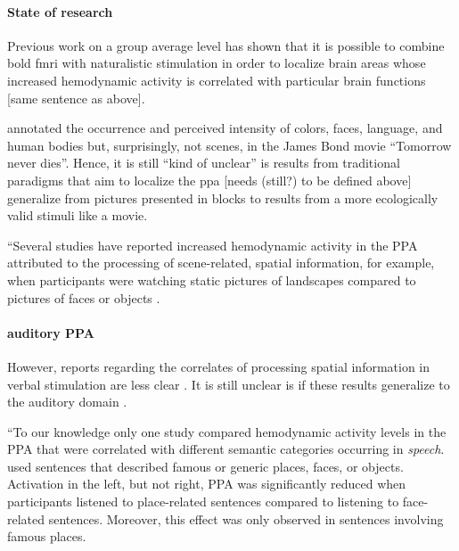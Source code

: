 \paragraph{State of research}
%
Previous work on a group average level has shown that it is possible to combine
\ac{bold} \ac{fmri} with naturalistic stimulation in order to localize brain
areas whose increased hemodynamic activity is correlated with particular brain
functions \citep{bartels2004mapping} [same sentence as above].

%
\citep{bartels2004mapping} annotated the occurrence and perceived intensity of
colors, faces, language, and human bodies but, surprisingly, not scenes, in the
James Bond movie ``Tomorrow never dies''.
%
Hence, it is still ``kind of unclear'' is results from traditional paradigms
that aim to localize the \ac{ppa} [needs (still?) to be defined above]
generalize from pictures presented in blocks to results from a more ecologically
valid stimuli like a movie.

``Several studies have reported increased hemodynamic activity in the PPA
attributed to the processing of scene-related, spatial information, for example,
when participants were watching static pictures of landscapes compared to
pictures of faces or objects \citep{epstein1998ppa, epstein1999parahippocampal}.



\paragraph{auditory PPA}


However, reports regarding the correlates of processing spatial information in
verbal stimulation are less clear \citep{aziz2008modulation}.
%
It is still unclear is if these results generalize to the auditory domain
\citep{aziz2008modulation}.

``To our knowledge only one study \citep{aziz2008modulation} compared
hemodynamic activity levels in the PPA that were correlated with different
semantic categories occurring in \textit{speech}.
\citet{aziz2008modulation} used sentences that described famous or generic
places, faces, or objects.
Activation in the left, but not right, PPA was significantly reduced when
participants listened to place-related sentences compared to listening to
face-related sentences. Moreover, this effect was only observed in sentences
involving famous places.


